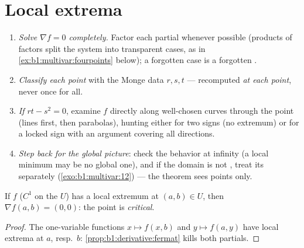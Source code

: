 \section{Local extrema}

\begin{method}
\label{met:b1:multivar:extremamethod}
\begin{enumerate}
  \item \emph{Solve $\nabla f = 0$ completely.} Factor each
        partial whenever possible (products of  factors
        split the system into transparent cases, as in
        \cref{ex:b1:multivar:fourpoints} below); a forgotten
        case is a forgotten .
  \item \emph{Classify each point} with the Monge data $r, s,
        t$ --- recomputed \emph{at each point}, never once for
        all.
  \item \emph{If $rt - s^2 = 0$}, examine $f$ directly along
        well-chosen curves through the point (lines first, then
        parabolas), hunting either for two signs (no extremum)
        or for a locked sign with an argument covering all
        directions.
  \item \emph{Step back for the global picture}: check the
        behavior at infinity (a local minimum may be no global
        one), and if the domain is not , treat its 
        separately (\cref{exo:b1:multivar:12}) --- the  theorem sees  points only.
\end{enumerate}
\end{method}

\begin{theorem}\label{thm:b1:multivar:critical}
If $f$ ($C^1$ on the  $U$) has a local extremum at $(a,b)
\in U$, then $\nabla f(a,b) = (0,0)$: the point is
\emph{critical}.
\end{theorem}

\begin{proof}
The one-variable functions $x \mapsto f(x, b)$ and $y \mapsto f(a,
y)$ have  local extrema at $a$, resp.\ $b$:
\cref{prop:b1:derivative:fermat} kills both partials.
\end{proof}

